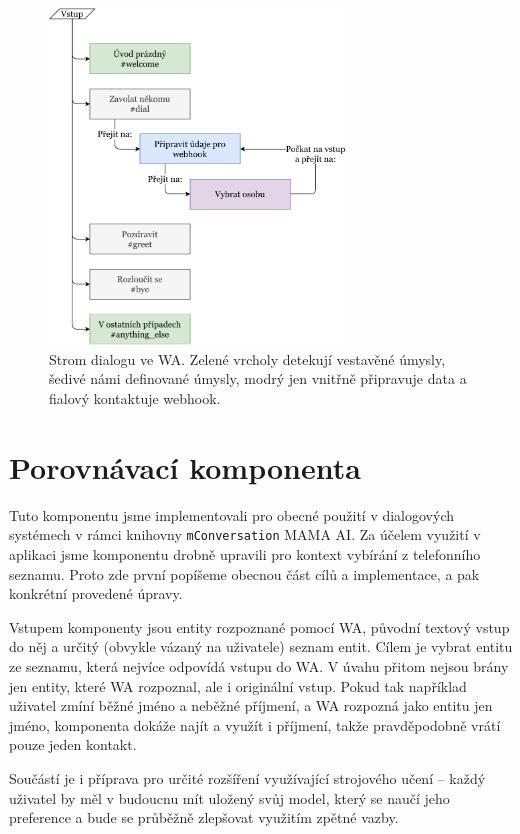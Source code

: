 \begin{figure}[h]
    \centering
    \includegraphics[width=0.7\textwidth]{../img/wa-tree.pdf}
    \caption{Strom dialogu ve WA. Zelené vrcholy detekují vestavěné úmysly,
        šedivé námi definované úmysly, modrý jen vnitřně připravuje data a fialový
        kontaktuje webhook.}
    \label{img-wa-tree}
\end{figure}

\section{Porovnávací komponenta}\label{matching}

Tuto komponentu jsme implementovali pro obecné použití v dialogových systémech
v rámci knihovny \texttt{mConversation} MAMA AI. Za účelem využití v aplikaci
jsme komponentu
drobně upravili pro kontext vybírání z telefonního seznamu. Proto zde první popíšeme
obecnou část cílů a implementace, a pak konkrétní provedené úpravy.

Vstupem komponenty jsou entity rozpoznané pomocí WA, původní textový vstup do něj
a určitý (obvykle vázaný na uživatele) seznam entit. Cílem je vybrat entitu ze seznamu,
která nejvíce odpovídá vstupu do WA. V úvahu přitom nejsou brány jen entity, které
WA rozpoznal, ale i originální vstup. Pokud tak například uživatel zmíní běžné jméno a
neběžné příjmení, a WA rozpozná jako entitu jen jméno, komponenta dokáže najít a využít
i příjmení, takže pravděpodobně vrátí pouze jeden kontakt.

Součástí je i příprava pro určité rozšíření využívající strojového učení -- každý
uživatel by měl v budoucnu mít uložený svůj model, který se naučí jeho preference a bude se
průběžně zlepšovat využitím zpětné vazby.

